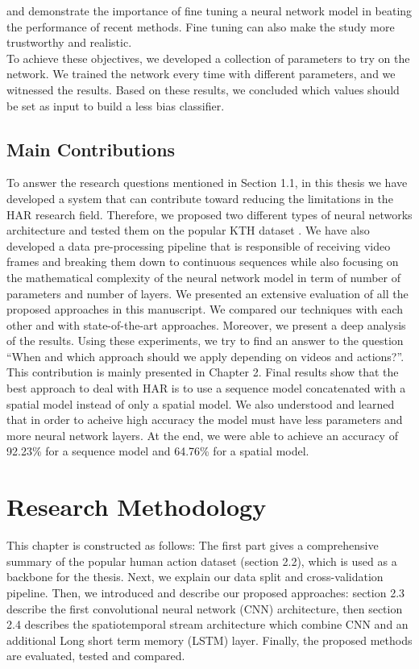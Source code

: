 \cite{diba2018spatio} and \cite{liu2018attentive} demonstrate the importance of fine tuning a neural network model in beating the performance of recent methods. Fine tuning can also make the study more trustworthy and realistic.\\
    
To achieve these objectives, we developed a collection of parameters to try on the network. We trained the network every time with different parameters, and we witnessed the results. Based on these results, we concluded which values should be set as input to build a less bias classifier.

\section{Main Contributions}
To answer the research questions mentioned in Section 1.1, in this thesis we have developed a system that can contribute toward reducing the limitations in the HAR research field. Therefore, we proposed two different types of neural networks architecture and tested them on the popular KTH dataset \cite{schuldt2004recognizing}. We have also developed a data pre-processing pipeline that is responsible of receiving video frames and breaking them down to continuous sequences while also focusing on the mathematical complexity of the neural network model in term of number of parameters and number of layers. We presented an extensive evaluation of all the proposed approaches in this manuscript. We compared our techniques with each other and with state-of-the-art approaches. Moreover, we present a deep analysis of the results. Using these experiments, we try to find an answer to the question “When and which approach should we apply depending on videos and actions?”. This contribution is mainly presented in Chapter 2. Final results show that the best approach to deal with HAR is to use a sequence model concatenated with a spatial model instead of only a spatial model. We also understood and learned that in order to acheive high accuracy the model must have less parameters and more neural network layers. At the end, we were able to achieve an accuracy of 92.23\% for a sequence model and 64.76\% for a spatial model.

\chapter{Research Methodology}\label{ThesisConventions}
This chapter is constructed as follows: The first part gives a comprehensive summary of the popular human action dataset (section 2.2), which is used as a backbone for the thesis. Next, we explain our data split and cross-validation pipeline. Then, we introduced and describe our proposed approaches: section 2.3 describe the first convolutional neural network (CNN) architecture, then section 2.4 describes the spatiotemporal stream architecture which combine CNN and an additional Long short term memory (LSTM) layer. Finally, the proposed methods are evaluated, tested and compared.


